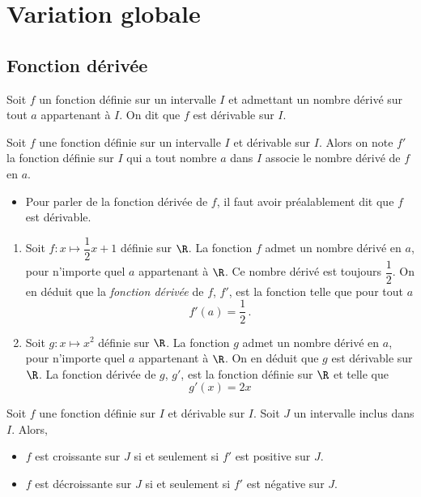 \documentclass{article}
\begin{document}
\section{Variation globale}
\subsection{Fonction dérivée}
\begin{definitionbox}
Soit $f$ un fonction définie sur un intervalle $I$ et admettant un nombre dérivé sur tout $a$ appartenant à $I$. On dit que $f$ est dérivable sur $I$.
\end{definitionbox}
\begin{definitionbox}
Soit $f$ une fonction définie sur un intervalle $I$ et dérivable sur $I$. Alors on note $f'$ la fonction définie sur $I$ qui a tout nombre $a$ dans $I$ associe le nombre dérivé de $f$ en $a$. 
\end{definitionbox}
\begin{remark}
\begin{itemize}
\item Pour parler de la fonction dérivée de $f$, il faut avoir préalablement dit que $f$ est dérivable. 
\end{itemize}
\end{remark}
\begin{example}
\begin{enumerate}
\item Soit $f \colon x \mapsto \dfrac{1}{2}x+1$ définie sur $\R$. La fonction $f$ admet un nombre dérivé en $a$, pour n'importe quel $a$ appartenant à $\R$. Ce nombre dérivé est toujours $\dfrac{1}{2}$. On en déduit que la \emph{fonction dérivée} de $f$, $f'$, est la fonction telle que pour tout $a$
\begin{equation*}
f'(a)=\dfrac{1}{2}\,.
\end{equation*} 
\item Soit $g \colon x \mapsto x^2$ définie sur $\R$. La fonction $g$ admet un nombre dérivé en $a$, pour n'importe quel $a$ appartenant à $\R$. On en déduit que $g$ est dérivable sur $\R$. La fonction dérivée de $g$, $g'$, est la fonction définie sur $\R$ et telle que
\begin{equation*}
g'(x)=2x
\end{equation*}
\end{enumerate}
\end{example}
\begin{tcolorbox}
\begin{proposition}
Soit $f$ une fonction définie sur $I$ et dérivable sur $I$. Soit $J$ un intervalle inclus dans $I$. Alors,
\begin{itemize}
\item $f$ est croissante sur $J$ si et seulement si $f'$ est positive sur $J$.
\item $f$ est décroissante sur $J$ si et seulement si $f'$ est négative sur $J$.
\end{itemize}
\end{proposition}
\end{tcolorbox}
\end{document}
